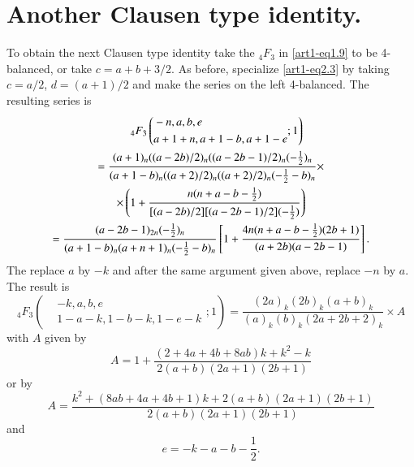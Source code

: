 \section{Another Clausen type identity.}\label{art1-sec3}
To obtain the next Clausen type identity take the ${}_4 F_3$ in \eqref{art1-eq1.9} to be 4-balanced, or take $c = a + b + 3/2$. As before, specialize \eqref{art1-eq2.3} by taking $c = a/2$, $d = (a+1)/2$ and make the series on the left 4-balanced. The resulting series is 
\setcounter{equation}{0}
\begin{gather}
 \quad {}_4 F_3 
\left(\begin{aligned}
& -n , a, b, e\\
& a+ 1+ n, a + 1 - b, a+ 1 -e 
\end{aligned} ;1
\right)\label{art1-eq3.1}\\
 =  \frac{(a+1)_n ((a-2b)/2)_n ((a-2b-1)/2)_n(-\frac{1}{2})_n}{(a+1-b)_n ((a+2)/2)_n ((a+2)/2)_n (-\frac{1}{2} -b)_n}
\times \notag\\
 \times
\left(1+ \frac{n (n+a-b-\frac{1}{2})}{[(a-2b)/2] [(a-2b-1)/2] (-\frac{1}{2})} \right)  \notag\\
= \frac{(a-2b-1)_{2n} (-\frac{1}{2})_n}{(a+1-b)_n (a+n+1)_n (-\frac{1}{2}-b)_n} 
\left[1+ \frac{4n (n+a-b-\frac{1}{2})(2b+1)}{(a+2b) (a-2b-1)} \right]. \notag
\end{gather}\pageoriginale 
The replace $a$ by $-k$ and after the same argument given above, replace $-n$ by $a$. The result is 
\begin{equation}
{}_4 F_3 
\left(
\begin{aligned}
&-k, a, b , e\\
& 1- a -k, 1-b-k, 1-e-k
\end{aligned};1
 \right) = \frac{(2a)_k (2b)_k (a+b)_k}{(a)_k (b)_k (2a+2b+2)_k} \times A
\label{art1-eq3.2}
\end{equation}
with $A$ given by 
\begin{equation}
A = 1 + \frac{(2+ 4a + 4 b + 8ab)k +k^2 -k}{2 (a+b) (2a+1) (2b+1)}
\label{art1-eq3.3}
\end{equation}
or by 
\begin{equation}
A = \frac{k^2 + (8ab + 4 a + 4b+1) k + 2 (a+b) (2a+1) (2b+1)}{2(a+b)(2a+1)(2b+1)}
\label{art1-eq3.4}
\end{equation}
and 
\begin{equation}
e =-k -a -b -\frac{1}{2}. \label{art1-eq3.5}
\end{equation}

